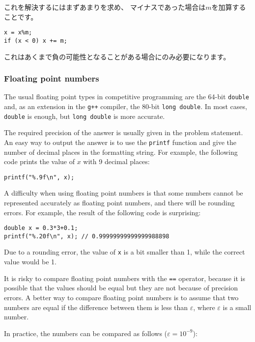 これを解決するにはまずあまりを求め、
マイナスであった場合は$m$を加算することです。
\begin{lstlisting}
x = x%m;
if (x < 0) x += m;
\end{lstlisting}
これはあくまで負の可能性となることがある場合にのみ必要になります。

\subsubsection{Floating point numbers}


The usual floating point types in
competitive programming are
the 64-bit \texttt{double}
and, as an extension in the \texttt{g++} compiler,
the 80-bit \texttt{long double}.
In most cases, \texttt{double} is enough,
but \texttt{long double} is more accurate.

The required precision of the answer
is usually given in the problem statement.
An easy way to output the answer is to use
the \texttt{printf} function
and give the number of decimal places
in the formatting string.
For example, the following code prints
the value of $x$ with 9 decimal places:

\begin{lstlisting}
printf("%.9f\n", x);
\end{lstlisting}

A difficulty when using floating point numbers
is that some numbers cannot be represented
accurately as floating point numbers,
and there will be rounding errors.
For example, the result of the following code
is surprising:

\begin{lstlisting}
double x = 0.3*3+0.1;
printf("%.20f\n", x); // 0.99999999999999988898
\end{lstlisting}

Due to a rounding error,
the value of \texttt{x} is a bit smaller than 1,
while the correct value would be 1.

It is risky to compare floating point numbers
with the \texttt{==} operator,
because it is possible that the values should be
equal but they are not because of precision errors.
A better way to compare floating point numbers
is to assume that two numbers are equal
if the difference between them is less than $\varepsilon$,
where $\varepsilon$ is a small number.

In practice, the numbers can be compared
as follows ($\varepsilon=10^{-9}$):

